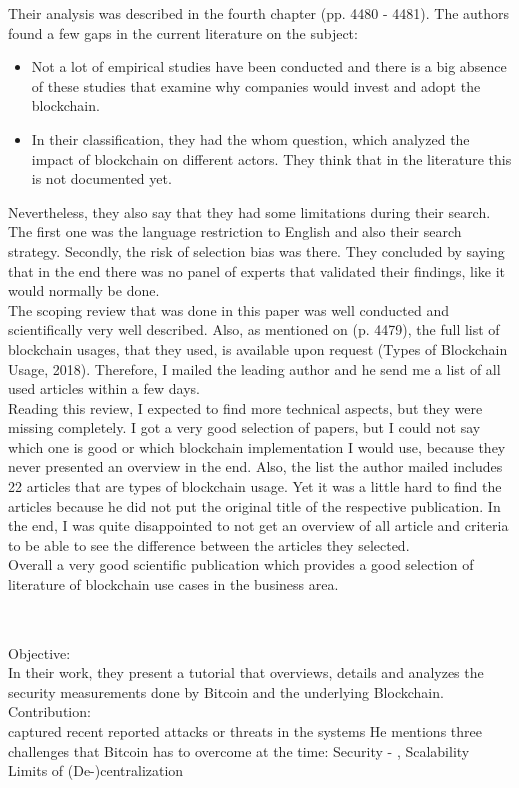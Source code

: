 Their analysis was described in the fourth chapter (pp. 4480 - 4481). The authors found a few gaps in the current literature on the subject:
\begin{itemize}
	\item Not a lot of empirical studies have been conducted and there is a big absence of these studies that examine why companies would invest and adopt the blockchain.
	\item In their classification, they had the whom question, which analyzed the impact of blockchain on different actors. They think that in the literature this is not documented yet.
\end{itemize}
Nevertheless, they also say that they had some limitations during their search. The first one was the language restriction to English and also their search strategy. Secondly, the risk of selection bias was there. They concluded by saying that in the end there was no panel of experts that validated their findings, like it would normally be done. \\
The scoping review that was done in this paper was well conducted and scientifically very well described. Also, as mentioned on (p. 4479), the full list of blockchain usages, that they used, is available upon request (Types of Blockchain Usage, 2018). Therefore, I mailed the leading author and he send me a list of all used articles within a few days. \\
Reading this review, I expected to find more technical aspects, but they were missing completely. I got a very good selection of papers, but I could not say which one is good or which blockchain implementation I would use, because they never presented an overview in the end. Also, the list the author mailed includes 22 articles that are types of blockchain usage. Yet it was a little hard to find the articles because he did not put the original title of the respective publication. In the end, I was quite disappointed to not get an overview of all article and criteria to be able to see the difference between the articles they selected.\\
Overall a very good scientific publication which provides a good selection of literature of blockchain use cases in the business area.\\ 
\subsection*{\citet{2016_Karame}}
\cite{2016_Karame}\\
Objective:\\
In their work, they present a tutorial that overviews, details and analyzes the security measurements done by Bitcoin and the underlying Blockchain.\\
Contribution:\\
captured recent reported attacks or threats in the systems
He mentions three challenges that Bitcoin has to overcome at the time:
Security - \cite{2015_Gervais}, \cite{2015_Heilman} \cite{2012_Karame}
Scalability 
Limits of (De-)centralization \cite{2014_Gervais}